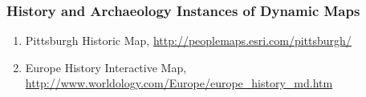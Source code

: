 \documentclass[hidelinks,12pt]{article}
\begin{document}
\subsubsection{History and Archaeology Instances of Dynamic Maps}
    \begin{enumerate}[label*=\arabic*.]
    \item Pittsburgh Historic Map, \url{http://peoplemaps.esri.com/pittsburgh/} 
    \item Europe History Interactive Map, \url{http://www.worldology.com/Europe/europe\_history\_md.htm}
    \end{enumerate}
\begin{comment}
  \item Works on Visualization focusing on map design and information
    convey

    The motivation to consider this is: throughout the analysis of
    existing mapping approaches, the majority of the map design are
    not quite thoughly considered and are with too much distraction
    from the actual information. Hence the authors think this aspect
    should be looked at and studied in further details.
    \begin{enumerate}[label*=\arabic*.]
    \item ``Data Visualization with Spacetime Maps'', Richard
      L. Brownrigg, 2005
    \item ``Effectiveness and efficiency of map symbols for dynamic
      geographic information visualization.'', Dong et al.\ 
    \item ``Geographic Visualization: Designing Manipulable Maps for
      Exploring Temporally Varying Georeferenced Statistics'', MacEachren et al.\
    \item ``Strategies for the Visualization of Geographic Time-Series
      Data'', Mark Monmonier, 2011
    \item ``Evaluation of Methods for Classifying Epidemiological Data
      on Choropleth Maps in Series'', Brewer and Pickle, 2002
    \end{enumerate}
  \item Works on Technology regarding 4D visualization
    \begin{enumerate}[label*=\arabic*.]
    \item ``Web-based 4D visualization of marine geo-data using
      WebGL'', Resch et al.\ , 2014
    \end{enumerate}
  \item Interface design of 4D visualization Case studies
    \begin{enumerate}[label*=\arabic*.]

\end{comment}
\end{document}
